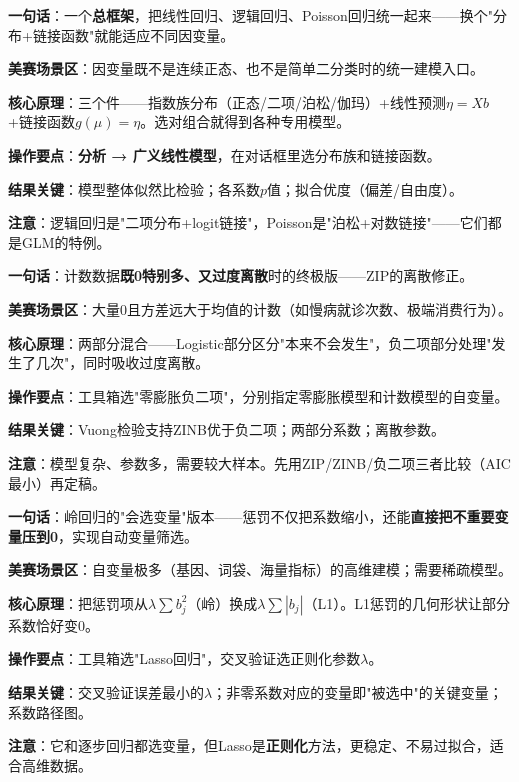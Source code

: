 
\begin{algobrief}
\textbf{一句话}：一个\textbf{总框架}，把线性回归、逻辑回归、Poisson回归统一起来——换个"分布+链接函数"就能适应不同因变量。

\textbf{美赛场景区}：因变量既不是连续正态、也不是简单二分类时的统一建模入口。

\textbf{核心原理}：三个件——指数族分布（正态/二项/泊松/伽玛）+线性预测$\eta=Xb$+链接函数$g(\mu)=\eta$。选对组合就得到各种专用模型。

\textbf{操作要点}：\textbf{分析 → 广义线性模型}，在对话框里选分布族和链接函数。

\textbf{结果关键}：模型整体似然比检验；各系数$p$值；拟合优度（偏差/自由度）。

\textbf{注意}：逻辑回归是"二项分布+logit链接"，Poisson是"泊松+对数链接"——它们都是GLM的特例。
\end{algobrief}


\begin{algobrief}
\textbf{一句话}：计数数据\textbf{既0特别多、又过度离散}时的终极版——ZIP的离散修正。

\textbf{美赛场景区}：大量0且方差远大于均值的计数（如慢病就诊次数、极端消费行为）。

\textbf{核心原理}：两部分混合——Logistic部分区分"本来不会发生"，负二项部分处理"发生了几次"，同时吸收过度离散。

\textbf{操作要点}：工具箱选"零膨胀负二项"，分别指定零膨胀模型和计数模型的自变量。

\textbf{结果关键}：Vuong检验支持ZINB优于负二项；两部分系数；离散参数。

\textbf{注意}：模型复杂、参数多，需要较大样本。先用ZIP/ZINB/负二项三者比较（AIC最小）再定稿。
\end{algobrief}


\begin{algobrief}
\textbf{一句话}：岭回归的"会选变量"版本——惩罚不仅把系数缩小，还能\textbf{直接把不重要变量压到0}，实现自动变量筛选。

\textbf{美赛场景区}：自变量极多（基因、词袋、海量指标）的高维建模；需要稀疏模型。

\textbf{核心原理}：把惩罚项从$\lambda\sum b_j^2$（岭）换成$\lambda\sum|b_j|$（L1）。L1惩罚的几何形状让部分系数恰好变0。

\textbf{操作要点}：工具箱选"Lasso回归"，交叉验证选正则化参数$\lambda$。

\textbf{结果关键}：交叉验证误差最小的$\lambda$；非零系数对应的变量即"被选中"的关键变量；系数路径图。

\textbf{注意}：它和逐步回归都选变量，但Lasso是\textbf{正则化}方法，更稳定、不易过拟合，适合高维数据。
\end{algobrief}
